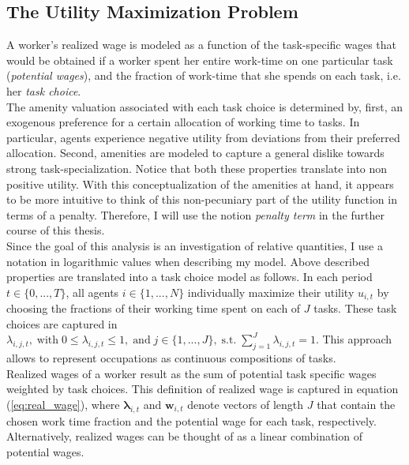 \documentclass[../main.tex]{subfiles}
\begin{document}
\subsection{The Utility Maximization Problem} \label{sec:utility-max-problem}
A worker's realized wage is modeled as a function of the task-specific wages that would be obtained if a worker spent her entire work-time on one particular task (\textit{potential wages}), and the fraction of work-time that she spends on each task, i.e. her \textit{task choice}.
\\
The amenity valuation associated with each task choice is determined by, first, an exogenous preference for a certain allocation of working time to tasks. In particular, agents experience negative utility from deviations from their preferred allocation. Second, amenities are modeled to capture a general dislike towards strong task-specialization. Notice that both these properties translate into non positive utility. With this conceptualization of the amenities at hand, it appears to be more intuitive to think of this non-pecuniary part of the utility function in terms of a penalty. Therefore, I will use the notion \textit{penalty term} in the further course of this thesis. 
\\
Since the goal of this analysis is an investigation of relative quantities, I use a notation in logarithmic values when describing my model. Above described properties are translated into a task choice model as follows. In each period $t \in \{0, ..., T\}$, all agents $i \in \{1, ..., N\}$ individually maximize their utility $u_{i,t}$ by choosing the fractions of their working time spent on each of $J$ tasks. These task choices are captured in $\lambda_{i,j,t}, \; \text{with} \; 0 \leq \lambda_{i,j,t} \leq 1, \; \text{and} \;j \in \{1, ..., J\}, \; \text{s.t.} \; \sum^J_{j=1} \lambda_{i,j,t} = 1$. This approach allows to represent occupations as continuous compositions of tasks.
\\ 
Realized wages of a worker result as the sum of potential task specific wages weighted by task choices. This definition of realized wage is captured in equation (\ref{eq:real_wage}), where $\boldsymbol{\lambda}_{i,t}$ and $\boldsymbol{w}_{i,t}$ denote vectors of length $J$ that contain the chosen work time fraction and the potential wage for each task, respectively. Alternatively, realized wages can be thought of as a linear combination of potential wages.
\end{document}
